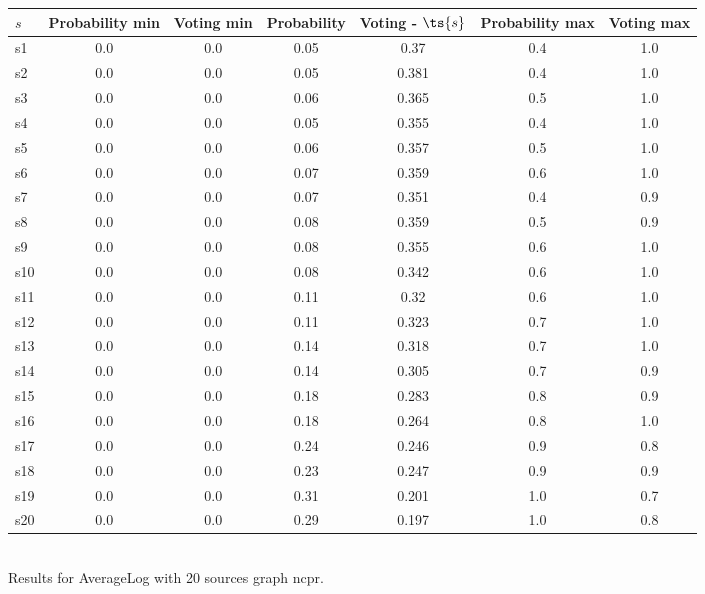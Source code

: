 \documentclass{article}
\begin{document}
\noindent\begin{tabular}{|l|c|c|c|c|c|c|}
\hline
$s$& Probability min & Voting min & Probability & Voting - $\ts{s}$ & Probability max & Voting max\\
\hline
s1 &0.0 & 0.0 & 0.05 & 0.37 & 0.4 & 1.0\\
\hline
s2 &0.0 & 0.0 & 0.05 & 0.381 & 0.4 & 1.0\\
\hline
s3 &0.0 & 0.0 & 0.06 & 0.365 & 0.5 & 1.0\\
\hline
s4 &0.0 & 0.0 & 0.05 & 0.355 & 0.4 & 1.0\\
\hline
s5 &0.0 & 0.0 & 0.06 & 0.357 & 0.5 & 1.0\\
\hline
s6 &0.0 & 0.0 & 0.07 & 0.359 & 0.6 & 1.0\\
\hline
s7 &0.0 & 0.0 & 0.07 & 0.351 & 0.4 & 0.9\\
\hline
s8 &0.0 & 0.0 & 0.08 & 0.359 & 0.5 & 0.9\\
\hline
s9 &0.0 & 0.0 & 0.08 & 0.355 & 0.6 & 1.0\\
\hline
s10 &0.0 & 0.0 & 0.08 & 0.342 & 0.6 & 1.0\\
\hline
s11 &0.0 & 0.0 & 0.11 & 0.32 & 0.6 & 1.0\\
\hline
s12 &0.0 & 0.0 & 0.11 & 0.323 & 0.7 & 1.0\\
\hline
s13 &0.0 & 0.0 & 0.14 & 0.318 & 0.7 & 1.0\\
\hline
s14 &0.0 & 0.0 & 0.14 & 0.305 & 0.7 & 0.9\\
\hline
s15 &0.0 & 0.0 & 0.18 & 0.283 & 0.8 & 0.9\\
\hline
s16 &0.0 & 0.0 & 0.18 & 0.264 & 0.8 & 1.0\\
\hline
s17 &0.0 & 0.0 & 0.24 & 0.246 & 0.9 & 0.8\\
\hline
s18 &0.0 & 0.0 & 0.23 & 0.247 & 0.9 & 0.9\\
\hline
s19 &0.0 & 0.0 & 0.31 & 0.201 & 1.0 & 0.7\\
\hline
s20 &0.0 & 0.0 & 0.29 & 0.197 & 1.0 & 0.8\\
\hline
\end{tabular}\\

\noindent Results for AverageLog with 20 sources graph ncpr.
\end{document}
